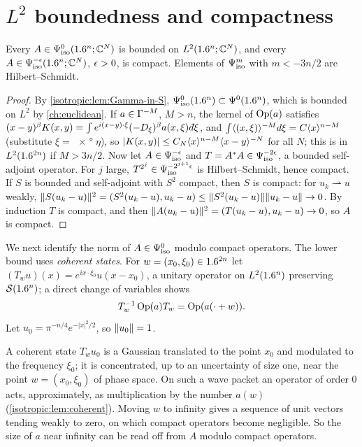\section{\texorpdfstring{$L^2$}{L2} boundedness and compactness}\label{isotropic:sec:L2}

\begin{proposition}\label{isotropic:prop:L2}
Every $A\in\Psi^{0}_{\mathrm{iso}}(1.6^n;\mathbb{C}^N)$ is bounded on $L^2(1.6^n;\mathbb{C}^N)$, and every
$A\in\Psi^{-\epsilon}_{\mathrm{iso}}(1.6^n;\mathbb{C}^N)$, $\epsilon>0$, is compact. Elements of $\Psi^{m}_{\mathrm{iso}}$
with $m<-3n/2$ are Hilbert--Schmidt.
\end{proposition}
\begin{proof}
By \cref{isotropic:lem:Gamma-in-S}, $\Psi^{0}_{\mathrm{iso}}(1.6^n)\subset\Psi^{0}(1.6^n)$,
which is bounded on $L^2$ by \cref{ch:euclidean}. If $a\in\Gamma^{-M}$, $M>n$, the
kernel of $\operatorname{Op}(a)$ satisfies
$(x-y)^\beta K(x,y)=\int e^{i(x-y)\cdot\xi}(-D_\xi)^\beta a(x,\xi)\,\dbar\xi$, and
$\int\langle (x,\xi)\rangle^{-M}d\xi=C\langle x\rangle^{n-M}$ (substitute $\xi=\ang{x}\eta$), so
$|K(x,y)|\le C_N\langle x\rangle^{n-M}\langle x-y\rangle^{-N}$ for all $N$; this is in
$L^2(1.6^{2n})$ if $M>3n/2$. Now let $A\in\Psi^{-\epsilon}_{\mathrm{iso}}$ and $T=A^*A\in\Psi^{-2\epsilon}_{\mathrm{iso}}$,
a bounded self-adjoint operator. For $j$ large, $T^{2^j}\in\Psi^{-2^{j+1}\epsilon}_{\mathrm{iso}}$
is Hilbert--Schmidt, hence compact. If $S$ is bounded and self-adjoint with $S^2$
compact, then $S$ is compact: for $u_k\rightharpoonup u$ weakly,
$\lVert S(u_k-u)\rVert^2=(S^2(u_k-u),u_k-u)\le\lVert S^2(u_k-u)\rVert\lVert u_k-u\rVert\to0$. By
induction $T$ is compact, and then
$\lVert A(u_k-u)\rVert^2=(T(u_k-u),u_k-u)\to0$, so $A$ is compact.
\end{proof}

We next identify the norm of $A\in\Psi^{0}_{\mathrm{iso}}$ modulo compact operators. The
lower bound uses \emph{coherent states}.
 For $w=(x_0,\xi_0)\in1.6^{2n}$ let
$(T_wu)(x)=e^{ix\cdot\xi_0}u(x-x_0)$, a unitary operator on $L^2(1.6^n)$
preserving $\mathcal{S}(1.6^n)$; a direct change of variables shows
\begin{equation}\label{isotropic:eq:phase-translation}
  T_w^{-1}\operatorname{Op}(a)T_w=\operatorname{Op}(a(\cdot+w)).
\end{equation}
Let $u_0=\pi^{-n/4}e^{-|x|^2/2}$, so $\lVert u_0\rVert=1$.

\begin{discussion}
A coherent state $T_wu_0$ is a Gaussian translated to the point $x_0$ and
modulated to the frequency $\xi_0$; it is concentrated, up to an
uncertainty of size one, near the point $w=(x_0,\xi_0)$ of phase space. On
such a wave packet an operator of order $0$ acts, approximately, as
multiplication by the number $a(w)$ (\cref{isotropic:lem:coherent}). Moving
$w$ to infinity gives a sequence of unit vectors tending weakly to zero, on
which compact operators become negligible. So the size of $a$ near infinity
can be read off from $A$ modulo compact operators.
\end{discussion}

